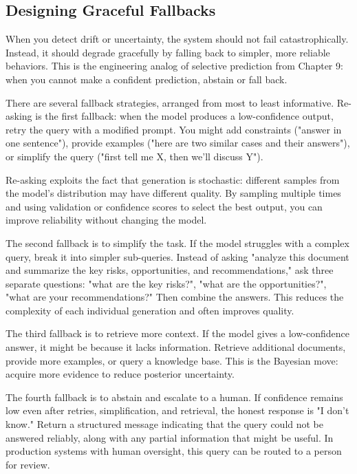 \subsection{Designing Graceful Fallbacks}

When you detect drift or uncertainty, the system should not fail catastrophically. Instead, it should degrade gracefully by falling back to simpler, more reliable behaviors. This is the engineering analog of selective prediction from Chapter 9: when you cannot make a confident prediction, abstain or fall back.

There are several fallback strategies, arranged from most to least informative. Re-asking is the first fallback: when the model produces a low-confidence output, retry the query with a modified prompt. You might add constraints ("answer in one sentence"), provide examples ("here are two similar cases and their answers"), or simplify the query ("first tell me X, then we'll discuss Y").

Re-asking exploits the fact that generation is stochastic: different samples from the model's distribution may have different quality. By sampling multiple times and using validation or confidence scores to select the best output, you can improve reliability without changing the model.

The second fallback is to simplify the task. If the model struggles with a complex query, break it into simpler sub-queries. Instead of asking "analyze this document and summarize the key risks, opportunities, and recommendations," ask three separate questions: "what are the key risks?", "what are the opportunities?", "what are your recommendations?" Then combine the answers. This reduces the complexity of each individual generation and often improves quality.

The third fallback is to retrieve more context. If the model gives a low-confidence answer, it might be because it lacks information. Retrieve additional documents, provide more examples, or query a knowledge base. This is the Bayesian move: acquire more evidence to reduce posterior uncertainty.

The fourth fallback is to abstain and escalate to a human. If confidence remains low even after retries, simplification, and retrieval, the honest response is "I don't know." Return a structured message indicating that the query could not be answered reliably, along with any partial information that might be useful. In production systems with human oversight, this query can be routed to a person for review.

